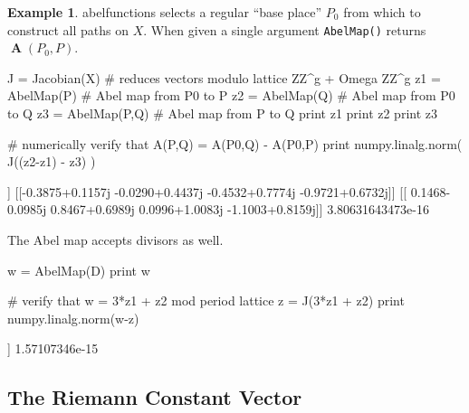 \documentclass[12pt]{article}
\theoremstyle{definition}
\newtheorem{example}[theorem]{Example}
\DeclareMathOperator{\Abel}{\boldsymbol{A}}
\begin{document}
\begin{example}
{\sc abelfunctions} selects a regular ``base place'' $P_0$ from which to
construct all paths on $X$. When given a single argument {\tt AbelMap()}
returns $\Abel(P_0,P)$.
\begin{ipythoninput}
J = Jacobian(X)   # reduces vectors modulo lattice ZZ^g + Omega ZZ^g
z1 = AbelMap(P)   # Abel map from P0 to P
z2 = AbelMap(Q)   # Abel map from P0 to Q
z3 = AbelMap(P,Q) # Abel map from P to Q
print z1
print z2
print z3

# numerically verify that A(P,Q) = A(P0,Q) - A(P0,P)
print numpy.linalg.norm( J((z2-z1) - z3) )
\end{ipythoninput}
\begin{ipythonoutput}
[[-0.5261+0.0864j  0.0669+0.6392j -0.7495+1.1037j -1.5030+1.0356j]]
[[-0.3875+0.1157j -0.0290+0.4437j -0.4532+0.7774j -0.9721+0.6732j]]
[[ 0.1468-0.0985j  0.8467+0.6989j  0.0996+1.0083j -1.1003+0.8159j]]
3.80631643473e-16
\end{ipythonoutput}
The Abel map accepts divisors as well.
\begin{ipythoninput}
w = AbelMap(D)
print w

# verify that w = 3*z1 + z2 mod period lattice
z = J(3*z1 + z2)
print numpy.linalg.norm(w-z)
\end{ipythoninput}
\begin{ipythonoutput}
[[ 0.0670-0.1361j  0.9421+0.7429j -0.4887+0.7663j -1.5057+0.6992j]]
1.57107346e-15
\end{ipythonoutput}
\end{example}



\subsection{The Riemann Constant Vector}
\end{document}
